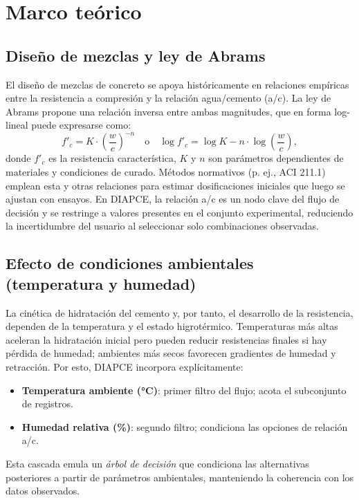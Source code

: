 \section{Marco teórico}
\subsection{Diseño de mezclas y ley de Abrams}
El diseño de mezclas de concreto se apoya históricamente en relaciones empíricas entre la resistencia a compresión y la relación agua/cemento (a/c). La ley de Abrams propone una relación inversa entre ambas magnitudes, que en forma log-lineal puede expresarse como:
\[
f'_c = K \cdot \left(\frac{w}{c}\right)^{-n}
\quad\text{o}\quad
\log f'_c = \log K - n \cdot \log\!\left(\frac{w}{c}\right),
\]
donde $f'_c$ es la resistencia característica, $K$ y $n$ son parámetros dependientes de materiales y condiciones de curado. Métodos normativos (p. ej., ACI 211.1) emplean esta y otras relaciones para estimar dosificaciones iniciales que luego se ajustan con ensayos. En DIAPCE, la relación a/c es un nodo clave del flujo de decisión y se restringe a valores presentes en el conjunto experimental, reduciendo la incertidumbre del usuario al seleccionar solo combinaciones observadas.

\subsection{Efecto de condiciones ambientales (temperatura y humedad)}
La cinética de hidratación del cemento y, por tanto, el desarrollo de la resistencia, dependen de la temperatura y el estado higrotérmico. Temperaturas más altas aceleran la hidratación inicial pero pueden reducir resistencias finales si hay pérdida de humedad; ambientes más secos favorecen gradientes de humedad y retracción. Por esto, DIAPCE incorpora explícitamente:
\begin{itemize}
    \item \textbf{Temperatura ambiente (°C)}: primer filtro del flujo; acota el subconjunto de registros.
    \item \textbf{Humedad relativa (\%)}: segundo filtro; condiciona las opciones de relación a/c.
\end{itemize}
Esta cascada emula un \textit{árbol de decisión} que condiciona las alternativas posteriores a partir de parámetros ambientales, manteniendo la coherencia con los datos observados.

